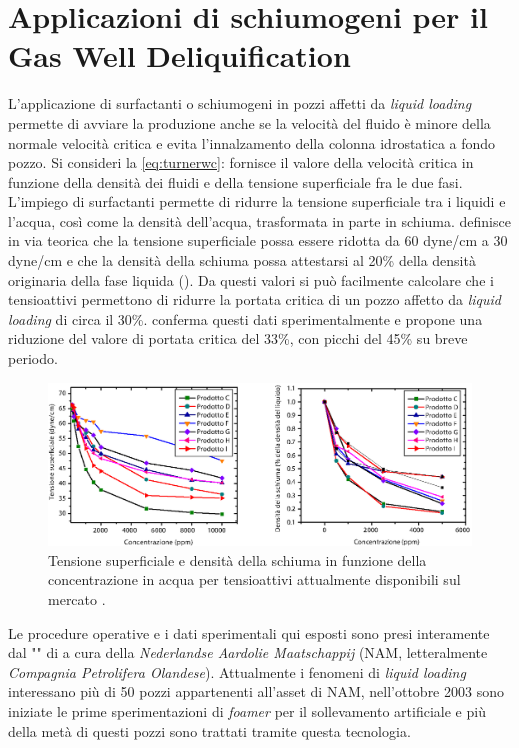 \section[Applicazione di schiumogeni per GWD]{Applicazioni di schiumogeni per il Gas Well Deliquification} \label{section:foamer-ll}
L'applicazione di surfactanti o schiumogeni in pozzi affetti da \textit{liquid loading} permette di avviare la produzione anche se la velocità del fluido è minore della normale velocità critica e evita l'innalzamento della colonna idrostatica a fondo pozzo. Si consideri la \eqref{eq:turnerwc}: \textcite{turner1969analysis} fornisce il valore della velocità critica in funzione della densità dei fluidi e della tensione superficiale fra le due fasi. L'impiego di surfactanti permette di ridurre la tensione superficiale tra i liquidi e l'acqua, così come la densità dell'acqua, trasformata in parte in schiuma. \textcite{campbell2001corrosion} definisce in via teorica che la tensione superficiale possa essere ridotta da 60 dyne/cm a 30 dyne/cm e che la densità della schiuma possa attestarsi al 20\% della densità originaria della fase liquida (). Da questi valori si può facilmente calcolare che i tensioattivi permettono di ridurre la portata critica di un pozzo affetto da \textit{liquid loading} di circa il 30\%. \textcite{wittfeld2015foam} conferma questi dati sperimentalmente e propone una riduzione del valore di portata critica del 33\%, con picchi del 45\% su breve periodo.

\begin{figure}[htbp]
    \centering
    \includegraphics[width=\textwidth]{fig/foamer/campbell.eps}
    \caption{Tensione superficiale e densità della schiuma in funzione della concentrazione in acqua per tensioattivi attualmente disponibili sul mercato \parencite{campbell2001corrosion}.}
    \label{fig:campbell}
\end{figure}

Le procedure operative e i dati sperimentali qui esposti sono presi interamente dal "" di \textcite{wittfeld2015foam} a cura della \textit{Nederlandse Aardolie Maatschappij} (NAM, letteralmente \textit{Compagnia Petrolifera Olandese}). Attualmente i fenomeni di \textit{liquid loading} interessano più di 50 pozzi appartenenti all'asset di NAM, nell'ottobre 2003 sono iniziate le prime sperimentazioni di \textit{foamer} per il sollevamento artificiale e più della metà di questi pozzi sono trattati tramite questa tecnologia.


